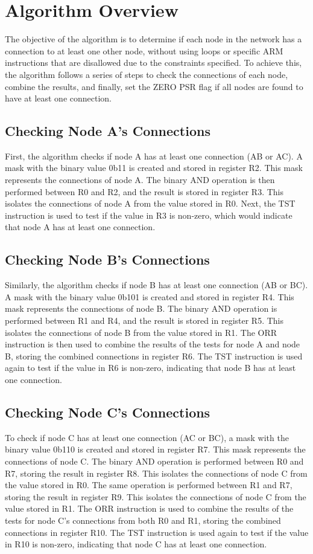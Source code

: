 \section{Algorithm Overview}
The objective of the algorithm is to determine if each node in the network has a connection to at least one other node, without using loops or specific ARM instructions that are disallowed due to the constraints specified. To achieve this, the algorithm follows a series of steps to check the connections of each node, combine the results, and finally, set the ZERO PSR flag if all nodes are found to have at least one connection.

\subsection{Checking Node A's Connections}
First, the algorithm checks if node A has at least one connection (AB or AC). A mask with the binary value 0b11 is created and stored in register R2. This mask represents the connections of node A. The binary AND operation is then performed between R0 and R2, and the result is stored in register R3. This isolates the connections of node A from the value stored in R0. Next, the TST instruction is used to test if the value in R3 is non-zero, which would indicate that node A has at least one connection.

\subsection{Checking Node B's Connections}
Similarly, the algorithm checks if node B has at least one connection (AB or BC). A mask with the binary value 0b101 is created and stored in register R4. This mask represents the connections of node B. The binary AND operation is performed between R1 and R4, and the result is stored in register R5. This isolates the connections of node B from the value stored in R1. The ORR instruction is then used to combine the results of the tests for node A and node B, storing the combined connections in register R6. The TST instruction is used again to test if the value in R6 is non-zero, indicating that node B has at least one connection.

\subsection{Checking Node C's Connections}
To check if node C has at least one connection (AC or BC), a mask with the binary value 0b110 is created and stored in register R7. This mask represents the connections of node C. The binary AND operation is performed between R0 and R7, storing the result in register R8. This isolates the connections of node C from the value stored in R0. The same operation is performed between R1 and R7, storing the result in register R9. This isolates the connections of node C from the value stored in R1. The ORR instruction is used to combine the results of the tests for node C's connections from both R0 and R1, storing the combined connections in register R10. The TST instruction is used again to test if the value in R10 is non-zero, indicating that node C has at least one connection.

